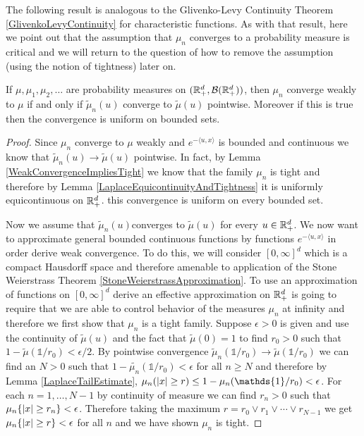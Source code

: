 The following result is analogous to the Glivenko-Levy Continuity
Theorem \ref{GlivenkoLevyContinuity} for characteristic functions.  As
with that result, here we point out that the assumption that $\mu_n$
converges to a probability measure is critical and we will return to the
question of how to remove the assumption (using the notion of tightness) later on.
\begin{thm}\label{GlivenkoLevyContinuityLaplace}If $\mu, \mu_1, \mu_2, \dots$
  are probability measures on $(\mathbb{R}^d_+, \mathcal{B}(\mathbb{R}^d_+))$,
  then $\mu_n$ converge weakly to $\mu$ if and only if $\tilde{\mu}_n(u)$
  converge to $\tilde{\mu}(u)$ pointwise.  Moreover if this is true
  then the convergence is uniform on bounded sets.
\end{thm}
\begin{proof}
Since $\mu_n$ converge to $\mu$ weakly and $e^{-\langle u,x \rangle}$
is bounded and continuous we know that $\tilde{\mu}_n(u) \to
\tilde{\mu}(u)$ pointwise.  In fact, by Lemma
\ref{WeakConvergenceImpliesTight} we know that the family $\mu_n$
is tight and therefore by Lemma
\ref{LaplaceEquicontinuityAndTightness} it is uniformly equicontinuous
on $\mathbb{R}^d_+$.  this convergence is uniform on
every bounded set.

Now we assume that $\tilde{\mu}_n(u)$converges to $\tilde{\mu}(u)$ for
every $u \in \mathbb{R}^d_+$.  We now want to approximate general bounded
continuous functions by functions $e^{-\langle u,x \rangle}$ in order
derive weak convergence.  To do this, we will consider $[0,\infty]^d$
which is a compact Hausdorff space and therefore amenable to
application of the Stone Weierstrass Theorem
\ref{StoneWeierstrassApproximation}.  To use an approximation of
functions on $[0,\infty]^d$ derive an effective approximation on
$\mathbb{R}^d_+$ is going to require that we are able to control behavior
of the measures $\mu_n$ at infinity and therefore we first show that
$\mu_n$ is a tight family.  Suppose $\epsilon > 0$ is given and use
the continuity of $\tilde{\mu}(u)$ and the fact that
$\tilde{\mu}(0)=1$ to find $r_0 > 0$ such that $1 - \tilde{\mu}(\mathds{1}/r_0) <
\epsilon/2$.  By pointwise convergence $\tilde{\mu}_n(\mathds{1}/r_0) \to \tilde{\mu}(\mathds{1}/r_0)$ we
can find an $N > 0$ such that $1 - \tilde{\mu_n}(\mathds{1}/r_0) < \epsilon$ for all $n
\geq N$ and therefore by Lemma \ref{LaplaceTailEstimate}, $\mu_n(\abs{x} \geq r)  \leq 1 - \mu_n(\mathds{1}/r_0) <
\epsilon$.  For each $n = 1, \dotsc, N-1$ by continuity of measure  we
can find $r_n > 0$ such that $\mu_n\lbrace \left \vert x \right \vert \geq r_n \rbrace <
\epsilon$.  Therefore taking the maximum $r = r_0 \vee r_1 \vee \dotsb \vee
r_{N-1}$ we get $\mu_n\lbrace \left \vert x \right \vert \geq r \rbrace <
\epsilon$ for all $n$ and we have shown $\mu_n$ is tight.


\end{proof}
